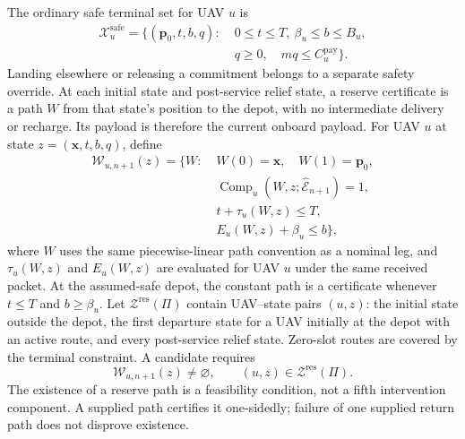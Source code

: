 The ordinary safe terminal set for UAV $u$ is
\begin{equation}
\begin{split}
\mathcal X_u^{\mathrm{safe}}=\{(\mathbf p_0,t,b,q):\;&
0\le t\le T,\ \beta_u\le b\le B_u,\\
&q\ge0,\quad m q\le C_u^{\mathrm{pay}}\}.
\end{split}
\label{eq:safe_terminal_set}
\end{equation}
Landing elsewhere or releasing a commitment belongs to a separate safety
override. At each initial state and post-service relief state, a reserve
certificate is a path $W$ from that state's position to the depot, with no
intermediate delivery or recharge. Its payload is therefore the current
onboard payload. For UAV $u$ at state $z=(\mathbf x,t,b,q)$, define
\begin{equation}
\begin{split}
\mathscr W_{u,n+1}(z)=\{W:\;&
W(0)=\mathbf x,\quad W(1)=\mathbf p_0,\\
&\operatorname{Comp}_u(W,z;\widehat{\mathcal E}_{n+1})=1,\\
&t+\tau_u(W,z)\le T,\\
&E_u(W,z)+\beta_u\le b\},
\end{split}
\label{eq:reserve_witness_set}
\end{equation}
where $W$ uses the same piecewise-linear path convention as a nominal leg,
and $\tau_u(W,z)$ and $E_u(W,z)$ are evaluated for UAV $u$ under the
same received packet. At the assumed-safe depot, the constant path is a
certificate whenever $t\le T$ and $b\ge\beta_u$.
Let $\mathcal Z^{\mathrm{res}}(\Pi)$ contain UAV--state pairs $(u,z)$:
the initial state outside the depot, the first departure state for a UAV
initially at the depot with an active route, and every post-service relief
state. Zero-slot routes are covered by the terminal constraint.
A candidate requires
\begin{equation}
\mathscr W_{u,n+1}(z)\ne\varnothing,
\qquad (u,z)\in\mathcal Z^{\mathrm{res}}(\Pi).
\label{eq:reserve_constraint}
\end{equation}
The existence of a reserve path is a feasibility condition, not a fifth
intervention component. A supplied path certifies it one-sidedly; failure
of one supplied return path does not disprove existence.

